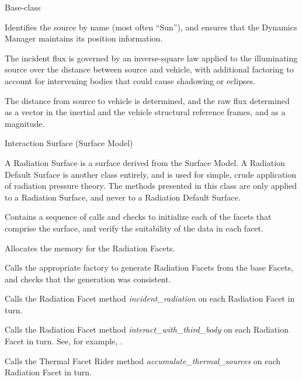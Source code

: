 {\begin{enumerate}
 Base-class


{\begin{enumerate}

Identifies the source by name (most often ``Sun''), and ensures that the
Dynamics Manager maintains its position information.


\label{ref:calculateflux}
The incident flux is governed by an inverse-square law applied to the
illuminating source over the distance between source and vehicle, with
additional factoring to account for intervening bodies that could cause
shadowing or eclipses.

The distance from source to vehicle is determined, and the raw flux
determined as a vector in the inertial and the vehicle structural reference
frames, and as a magnitude.

\end{enumerate}}


 Interaction Surface (Surface Model)

A Radiation Surface is a surface derived from the Surface Model.  A Radiation
Default Surface is another class entirely, and is used for simple, crude
application of radiation pressure theory.  The methods presented in this class
are only applied to a Radiation Surface, and never to a Radiation Default
Surface.
{\begin{enumerate}

Contains a sequence of calls and checks to initialize each of the facets that
comprise the surface, and verify the suitability of the data in each facet.

Allocates the memory for the Radiation Facets.

Calls the appropriate factory to generate Radiation Facets from the base
Facets, and checks that the generation was consistent.

Calls the Radiation Facet method \textit{incident\_radiation} on each Radiation
Facet in turn.

\label{method:interactwiththirdbody}
Calls the Radiation Facet method \textit{interact\_with\_third\_body}  on each
Radiation Facet in turn.  See, for example,
.

Calls the Thermal Facet Rider method \textit{accumulate\_thermal\_sources} on
each Radiation Facet in turn.


\end{enumerate}}
\end{enumerate}}
